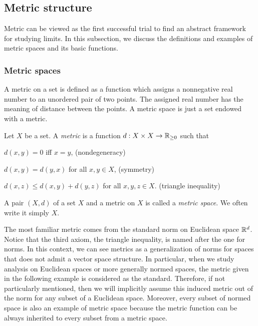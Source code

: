 \subsection{Metric structure}

Metric can be viewed as the first successful trial to find an abstract framework for studying limits.
In this subsection, we discuss the definitions and examples of metric spaces and its basic functions.

\subsubsection{Metric spaces}

A metric on a set is defined as a function which assigns a nonnegative real number to an unordered pair of two points.
The assigned real number has the meaning of distance between the points.
A metric space is just a set endowed with a metric.

\begin{defn}
Let $X$ be a set.
A \emph{metric} is a function $d:X\x X\to\R_{\ge0}$ such that
\begin{cond}
\item $d(x,y)=0$ iff $x=y$, \hfill(nondegeneracy)
\item $d(x,y)=d(y,x)$ for all $x,y\in X$, \hfill(symmetry)
\item $d(x,z)\le d(x,y)+d(y,z)$ for all $x,y,z\in X$. \hfill(triangle inequality)
\end{cond}
A pair $(X,d)$ of a set $X$ and a metric on $X$ is called a \emph{metric space}.
We often write it simply $X$.
\end{defn}

The most familiar metric comes from the standard norm on Euclidean space $\mathbb{R}^d$.
Notice that the third axiom, the triangle inequality, is named after the one for norms.
In this context, we can see metrics as a generalization of norms for spaces that does not admit a vector space structure.
In particular, when we study analysis on Euclidean spaces or more generally normed spaces, the metric given in the following example is considered as the standard.
Therefore, if not particularly mentioned, then we will implicitly assume this induced metric out of the norm for any subset of a Euclidean space.
Moreover, every subset of normed space is also an example of metric space because the metric function can be always inherited to every subset from a metric space.

